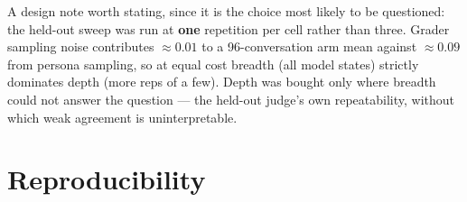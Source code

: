 A design note worth stating, since it is the choice most likely to be questioned: the
held-out sweep was run at \textbf{one} repetition per cell rather than three. Grader
sampling noise contributes ${\approx}0.01$ to a 96-conversation arm mean against
${\approx}0.09$ from persona sampling, so at equal cost breadth (all model states) strictly
dominates depth (more reps of a few). Depth was bought only where breadth could not answer
the question --- the held-out judge's own repeatability, without which weak \mici{}
agreement is uninterpretable.

\section{Reproducibility}
\label{app:repro}

